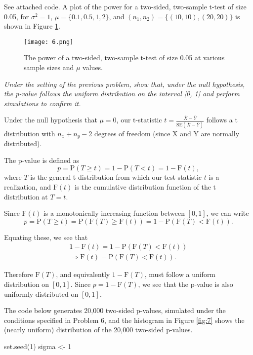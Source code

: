 \documentclass[11pt]{exam} %
\newenvironment{codeSmall}%
   {\par\noindent\adjustbox{margin=1ex,bgcolor=shadecolor,margin=0ex \medskipamount}\bgroup\minipage\linewidth\verbatim\footnotesize}%
   {\endverbatim\endminipage\egroup}
\begin{document}
\begin{questions}
See attached code. A plot of the power for a two-sided, two-sample t-test of size 0.05, for $\sigma^2 =1$, $\mu = \{0.1, 0.5, 1, 2 \}$, and $(n_1, n_2) = \{(10,10), (20,20)\}$ is shown in Figure \ref{fig:6}.

\begin{figure}[!h]
	\centering
	\texttt{[image: 6.png]}
	\caption{The power of a two-sided, two-sample t-test of size 0.05 at various sample sizes and $\mu$ values.}
	\label{fig:6}
\end{figure}



\titledquestion{} %
\textit{Under the setting of the previous problem, show that, under the null hypothesis, the p-value follows the uniform distribution on the interval [0, 1] and perform simulations to confirm it.}

Under the null hypothesis that $\mu=0$, our t-statistic $t=\frac{\overline{X}-\overline{Y}}{\text{SE}(\overline{X}-\overline{Y})}$ follows a t distribution with $n_x + n_y -2$ degrees of freedom (since X and Y are normally distributed).

The p-value is defined as
$$p = \text{P}(T \geq t) = 1-\text{P}(T < t) = 1-\text{F}(t),$$
where $T$ is the general t distribution from which our test-statistic $t$ is a realization, and $\text{F}(t)$ is the cumulative distribution function of the t distribution at $T=t$.

Since $\text{F}(t)$ is a monotonically increasing function between $[0,1]$, we can write
$$p = \text{P}(T \geq t) = \text{P}(\text{F}(T) \geq \text{F}(t)) = 1 - \text{P}(\text{F}(T) < \text{F}(t)).$$

Equating these, we see that
\begin{gather*}
1-\text{F}(t) = 1 - \text{P}(\text{F}(T) < \text{F}(t)) \\
\Rightarrow \text{F}(t) = \text{P}(\text{F}(T) < \text{F}(t)).
\end{gather*}

Therefore $\text{F}(T)$, and equivalently $1-\text{F}(T)$, must follow a uniform distribution on $[0,1]$. Since $p=1-\text{F}(T)$, we see that the p-value is also uniformly distributed on $[0,1]$.

The code below generates 20,000 two-sided p-values, simulated under the conditions specified in Problem 6, and the histogram in Figure \ref{fig:7} shows the (nearly uniform) distribution of the 20,000 two-sided p-values.

\begin{codeSmall}
set.seed(1)
sigma <- 1


\end{codeSmall}
\end{questions}
\end{document}
